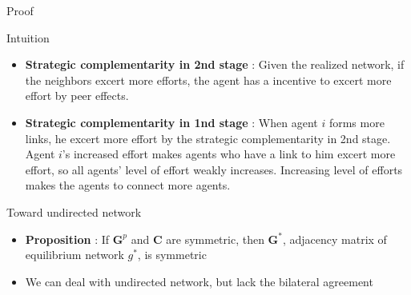 \documentclass[10pt,dvipdfmx]{beamer}
\begin{document}
\begin{frame}{Proof}
\end{frame}

\begin{frame}{Intuition}
\begin{itemize}
    \item {\bf{Strategic complementarity in 2nd stage}} : Given the realized network, if the neighbors excert more efforts, the agent has a incentive to excert more effort by peer effects.
    \item {\bf{Strategic complementarity in 1nd stage}} : When agent $i$ forms more links, he excert more effort by the strategic complementarity in 2nd stage. Agent $i$'s increased effort makes agents who have a link to him excert more effort, so all agents' level of effort weakly increases. Increasing level of efforts makes the agents to connect more agents.
\end{itemize}
\end{frame}

\begin{frame}{Toward undirected network}
\begin{itemize}
    \item {\bf{Proposition}} : If $\bm{G}^p$ and $\bm{C}$ are symmetric, then $\bm{G}^*$, adjacency matrix of equilibrium network $g^*$, is symmetric
    \item We can deal with undirected network, but lack the bilateral agreement
\end{itemize}
\end{frame}
\end{document}
